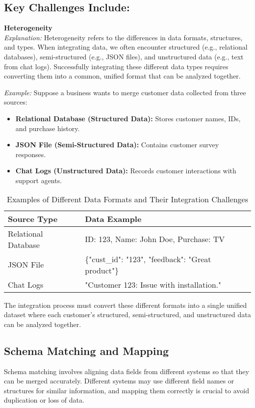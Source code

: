 \documentclass[12pt]{article}
\begin{document}
\subsection{Key Challenges Include:}
\textbf{Heterogeneity} \\
\textit{Explanation:} Heterogeneity refers to the differences in data formats, structures, and types. When integrating data, we often encounter structured (e.g., relational databases), semi-structured (e.g., JSON files), and unstructured data (e.g., text from chat logs). Successfully integrating these different data types requires converting them into a common, unified format that can be analyzed together.

\textit{Example:} Suppose a business wants to merge customer data collected from three sources:
\begin{itemize}
    \item \textbf{Relational Database (Structured Data):} Stores customer names, IDs, and purchase history.
    \item \textbf{JSON File (Semi-Structured Data):} Contains customer survey responses.
    \item \textbf{Chat Logs (Unstructured Data):} Records customer interactions with support agents.
\end{itemize}

\begin{table}[H]
    \centering
    \begin{tabular}{|p{4cm}|p{8cm}|}
        \hline
        \textbf{Source Type} & \textbf{Data Example} \\ \hline
        Relational Database & ID: 123, Name: John Doe, Purchase: TV \\ \hline
        JSON File & \{"cust\_id": "123", "feedback": "Great product"\} \\ \hline
        Chat Logs & "Customer 123: Issue with installation." \\ \hline
    \end{tabular}
    \caption{Examples of Different Data Formats and Their Integration Challenges}
\end{table}

The integration process must convert these different formats into a single unified dataset where each customer's structured, semi-structured, and unstructured data can be analyzed together.

\subsection{Schema Matching and Mapping}
Schema matching involves aligning data fields from different systems so that they can be merged accurately. Different systems may use different field names or structures for similar information, and mapping them correctly is crucial to avoid duplication or loss of data.
\end{document}
